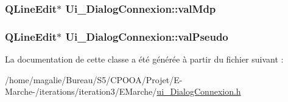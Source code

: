 \hypertarget{class_ui___dialog_connexion_ae59151879eebdd101eaae39a532cdff8}{
\subsubsection[{val\-Mdp}]{\setlength{\rightskip}{0pt plus 5cm}Q\-Line\-Edit$\ast$ Ui\-\_\-\-Dialog\-Connexion\-::val\-Mdp}}\label{class_ui___dialog_connexion_ae59151879eebdd101eaae39a532cdff8}
\hypertarget{class_ui___dialog_connexion_a4560ad500c66e02c38d52f01b71c5c8b}{
\subsubsection[{val\-Pseudo}]{\setlength{\rightskip}{0pt plus 5cm}Q\-Line\-Edit$\ast$ Ui\-\_\-\-Dialog\-Connexion\-::val\-Pseudo}}\label{class_ui___dialog_connexion_a4560ad500c66e02c38d52f01b71c5c8b}


La documentation de cette classe a été générée à partir du fichier suivant \-:\begin{DoxyCompactItemize}
\item 
/home/magalie/\-Bureau/\-S5/\-C\-P\-O\-O\-A/\-Projet/\-E-\/\-Marche-\//iterations/iteration3/\-E\-Marche/\hyperlink{ui___dialog_connexion_8h}{ui\-\_\-\-Dialog\-Connexion.\-h}\end{DoxyCompactItemize}
